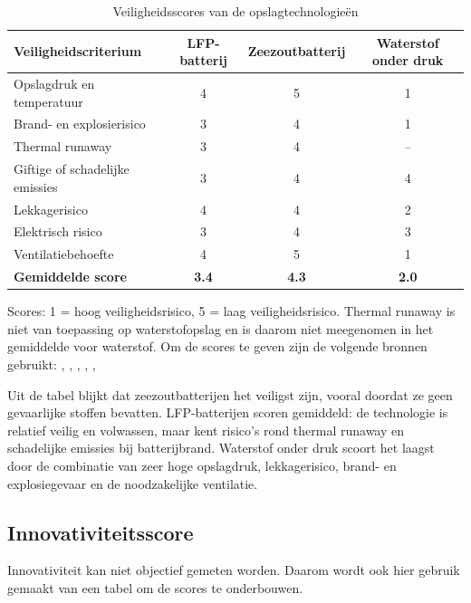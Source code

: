 \begin{table}[H]
\centering
\caption{Veiligheidsscores van de opslagtechnologieën}
\label{tab:veiligheid_scores}
\renewcommand{\arraystretch}{1.25}
\begin{tabular}{l c c c}
\hline
\textbf{Veiligheidscriterium} 
& \textbf{LFP-batterij} 
& \textbf{Zeezoutbatterij} 
& \textbf{Waterstof onder druk} \\
\hline
Opslagdruk en temperatuur & 4 & 5 & 1 \\
Brand- en explosierisico & 3 & 4 & 1 \\
Thermal runaway & 3 & 4 & -- \\
Giftige of schadelijke emissies & 3 & 4 & 4 \\
Lekkagerisico & 4 & 4 & 2 \\
Elektrisch risico & 3 & 4 & 3 \\
Ventilatiebehoefte & 4 & 5 & 1 \\
\hline
\textbf{Gemiddelde score} & \textbf{3.4} & \textbf{4.3} & \textbf{2.0} \\
\hline
\end{tabular}

\vspace{0.2cm}
\footnotesize{Scores: 1 = hoog veiligheidsrisico, 5 = laag veiligheidsrisico. Thermal runaway is niet van toepassing op waterstofopslag en is daarom niet meegenomen in het gemiddelde voor waterstof.} Om de scores te geven zijn de volgende bronnen gebruikt: \cite{Yu2025ThermalRunawayLFP}, \cite{Tian2021SeawaterBatteries}, \cite{DOEHydrogenStorage}, \cite{Tukes2024HydrogenSafety}, \cite{Bugryniec2024GasEmissionsLIB}, \cite{DNV2026HydrogenFuelledShipsSafety}
\end{table}

\noindent Uit de tabel blijkt dat zeezoutbatterijen het veiligst zijn, vooral doordat ze geen gevaarlijke stoffen bevatten. LFP-batterijen scoren gemiddeld: de technologie is relatief veilig en volwassen, maar kent risico's rond thermal runaway en schadelijke emissies bij batterijbrand. Waterstof onder druk scoort het laagst door de combinatie van zeer hoge opslagdruk, lekkagerisico, brand- en explosiegevaar en de noodzakelijke ventilatie.\\


\subsection*{Innovativiteitsscore}
\noindent Innovativiteit kan niet objectief gemeten worden. Daarom wordt ook hier gebruik gemaakt van een tabel om de scores te onderbouwen.

